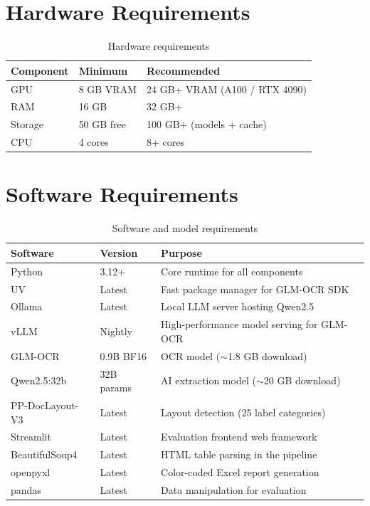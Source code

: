 \documentclass[12pt,a4paper]{report}
\begin{document}
\section{Hardware Requirements}

\begin{table}[H]
\centering\sffamily
\begin{tabularx}{\textwidth}{l X X}
\toprule
\textbf{Component} & \textbf{Minimum} & \textbf{Recommended} \\
\midrule
GPU & 8 GB VRAM & 24 GB+ VRAM (A100 / RTX 4090) \\
RAM & 16 GB & 32 GB+ \\
Storage & 50 GB free & 100 GB+ (models + cache) \\
CPU & 4 cores & 8+ cores \\
\bottomrule
\end{tabularx}
\caption{Hardware requirements}
\end{table}

\section{Software Requirements}

\begin{table}[H]
\centering\small\sffamily
\begin{tabularx}{\textwidth}{l l X}
\toprule
\textbf{Software} & \textbf{Version} & \textbf{Purpose} \\
\midrule
Python & 3.12+ & Core runtime for all components \\
UV & Latest & Fast package manager for GLM-OCR SDK \\
Ollama & Latest & Local LLM server hosting Qwen2.5 \\
vLLM & Nightly & High-performance model serving for GLM-OCR \\
\midrule
GLM-OCR & 0.9B BF16 & OCR model ($\sim$1.8 GB download) \\
Qwen2.5:32b & 32B params & AI extraction model ($\sim$20 GB download) \\
PP-DocLayout-V3 & Latest & Layout detection (25 label categories) \\
\midrule
Streamlit & Latest & Evaluation frontend web framework \\
BeautifulSoup4 & Latest & HTML table parsing in the pipeline \\
openpyxl & Latest & Color-coded Excel report generation \\
pandas & Latest & Data manipulation for evaluation \\
\bottomrule
\end{tabularx}
\caption{Software and model requirements}
\end{table}
\end{document}
